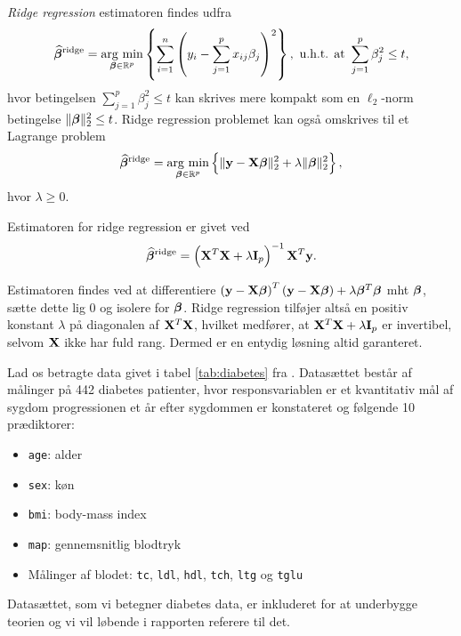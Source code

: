 \textit{Ridge regression} estimatoren findes udfra 
\begin{align} 
\widehat{\tbeta}^\text{ridge} = \argmin_{\tbeta \in \R^p} \cbr{\sum_{i=1}^n \del{y_i - \sum_{j=1}^p x_{ij} \beta_j}^2}, \ \text{u.h.t. at } \sum_{j=1}^p \beta_j^2 \leq t, \label{eq:2.7} 
\end{align} 
hvor betingelsen $\sum_{j=1}^p \beta_j^2 \leq t$ kan skrives mere kompakt som en \(\ell_2\)-norm betingelse $\Vert \boldsymbol{\beta} \Vert_2^2 \leq t$.
Ridge regression problemet kan også omskrives til et Lagrange problem
\begin{align*}
\widehat{\tbeta}^\text{ridge} = \argmin_{\tbeta \in \R^p} \cbr{ \Vert \y - \X \tbeta \Vert_2^2 + \lambda \Vert \tbeta \Vert_2^2},
\end{align*}
hvor $\lambda \geq 0$.
\begin{defn}
Estimatoren for ridge regression er givet ved
\begin{align} 
\widehat{\tbeta}^\text{ridge} = \del{\X^T \X + \lambda \mathbf{I}_p}^{-1} \X^T \y. \label{eq:ridge_estimator}
\end{align} 
\end{defn}
Estimatoren findes ved at differentiere \(\del{\y - \X \tbeta}^T \del{\y - \X \tbeta} + \lambda \tbeta^T \tbeta\) mht $\boldsymbol{\beta}$, sætte dette lig 0 og isolere for $\boldsymbol{\beta}$.
Ridge regression tilføjer altså en positiv konstant $\lambda$ på diagonalen af $\mathbf{X}^T \mathbf{X}$, hvilket medfører, at \(\mathbf{X}^T \mathbf{X} + \lambda \mathbf{I}_p\) er invertibel, selvom $\mathbf{X}$ ikke har fuld rang. 
Dermed er en entydig løsning altid garanteret. 
%
\begin{exmp}
Lad os betragte data givet i tabel \ref{tab:diabetes} fra \citep{efron}.
Datasættet består af målinger på 442 diabetes patienter, hvor responsvariablen er et kvantitativ mål af sygdom progressionen et år efter sygdommen er konstateret og følgende 10 prædiktorer: 
\begin{itemize}
\item \texttt{age}: alder
\item \texttt{sex}: køn
\item \texttt{bmi}: body-mass index
\item \texttt{map}: gennemsnitlig blodtryk
\item Målinger af blodet:  \texttt{tc},  \texttt{ldl}, \texttt{hdl}, \texttt{tch}, \texttt{ltg} og \texttt{tglu}
\end{itemize}
%

%
Datasættet, som vi betegner diabetes data, er inkluderet for at underbygge teorien og vi vil løbende i rapporten referere til det.
\end{exmp}
